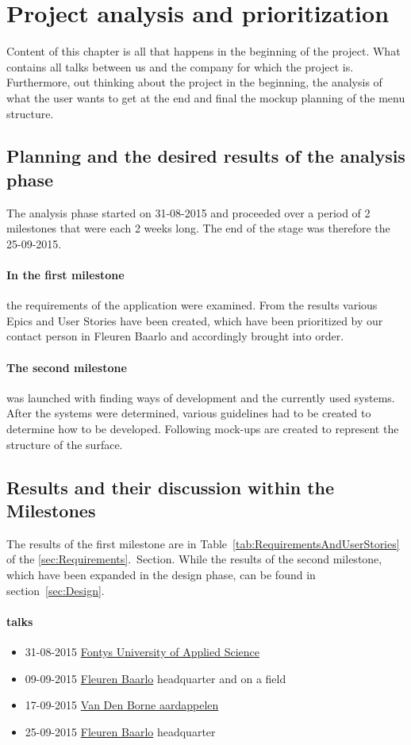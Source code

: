 \section{Project analysis and prioritization}
\label{analysis}
Content of this chapter is all that happens in the beginning of the project. What contains all talks between us and the company for which the project is. Furthermore, out thinking about the project in the beginning, the analysis of what the user wants to get at the end and final the mockup planning of the menu structure.

\subsection{Planning and the desired results of the analysis phase}
The analysis phase started on 31-08-2015 and proceeded over a period of 2 milestones that were each 2 weeks long. The end of the stage was therefore the 25-09-2015.

\paragraph{In the first milestone} the requirements of the application were examined. From the results various Epics and User Stories have been created, which have been prioritized by our contact person in Fleuren Baarlo and accordingly brought into order.

\paragraph{The second milestone} was launched with finding ways of development and the currently used systems. After the systems were determined, various guidelines had to be created to determine how to be developed.
Following mock-ups are created to represent the structure of the surface.

\subsection{Results and their discussion within the Milestones}
The results of the first milestone are in Table~\ref{tab:RequirementsAndUserStories} of the \ref{sec:Requirements}.~Section. While the results of the second milestone, which have been expanded in the design phase, can be found in section~\ref{sec:Design}.

\paragraph{talks}
\begin{itemize}
	\item 31-08-2015 \href{http://fontys.nl}{Fontys University of Applied Science}
	\item 09-09-2015 \href{http://fleuren.net}{Fleuren Baarlo} headquarter and on a field
	\item 17-09-2015 \href{http://www.vandenborneaardappelen.com}{Van Den Borne aardappelen} 
	\item 25-09-2015 \href{http://fleuren.net}{Fleuren Baarlo} headquarter
\end{itemize}